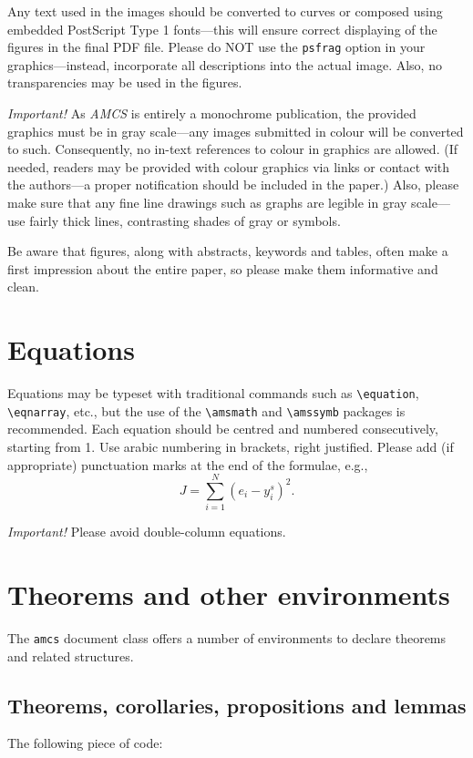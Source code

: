 \documentclass{amcs}
\begin{document}
Any text used in the images should be converted to curves or composed using embedded PostScript Type 1 fonts---this will ensure correct displaying of the figures in the final PDF file. Please do NOT use the \verb+psfrag+ option in your graphics---instead, incorporate all descriptions into the actual image. Also, no transparencies may be used in the figures.

\emph{Important!} As \emph{AMCS} is entirely a monochrome publication, the provided graphics must be in gray scale---any images submitted in colour will be converted to such. Consequently, no in-text references to colour in graphics are allowed. (If needed, readers may be provided with colour graphics via links or contact with the authors---a proper notification should be included in the paper.) Also, please make sure that any fine line drawings such as graphs are legible in gray scale---use fairly thick lines, contrasting shades of gray or symbols.

Be aware that figures, along with abstracts, keywords and tables, often make a first impression about the entire paper, so please make them informative and clean.

\section{Equations}
Equations may be typeset with traditional commands such as \verb+\equation+, \verb+\eqnarray+, etc., but the use of the \verb+\amsmath+ and \verb+\amssymb+ packages is recommended. Each equation should be centred and numbered consecutively, starting from 1. Use arabic numbering in brackets, right justified. Please add (if appropriate) punctuation marks at the end of the formulae, e.g.,
%
\begin{equation}
  J=\sum_{i=1}^N(e_i-y_i^s)^2.
\end{equation}

\noindent \emph{Important!} Please avoid double-column equations.

\section{Theorems and other environments}
The \verb+amcs+ document class offers a number of environments to declare theorems and related structures.

\subsection{Theorems, corollaries, propositions and lemmas} The following piece of code:
\end{document}

